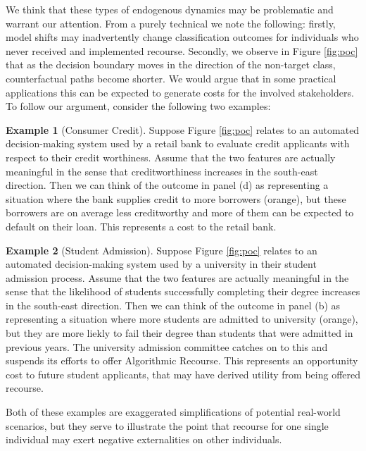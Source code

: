 \documentclass[conference,final,]{IEEEtran}
\theoremstyle{definition}
\theoremstyle{definition}
\newtheorem{example}{Example}[section]
\theoremstyle{definition}
\theoremstyle{definition}
\theoremstyle{remark}
\begin{document}
We think that these types of endogenous dynamics may be problematic and warrant our attention. From a purely technical we note the following: firstly, model shifts may inadvertently change classification outcomes for individuals who never received and implemented recourse. Secondly, we observe in Figure \ref{fig:poc} that as the decision boundary moves in the direction of the non-target class, counterfactual paths become shorter. We would argue that in some practical applications this can be expected to generate costs for the involved stakeholders. To follow our argument, consider the following two examples:

\begin{example}[Consumer Credit]
\protect\hypertarget{exm:consumer}{}\label{exm:consumer}Suppose Figure \ref{fig:poc} relates to an automated decision-making system used by a retail bank to evaluate credit applicants with respect to their credit worthiness. Assume that the two features are actually meaningful in the sense that creditworthiness increases in the south-east direction. Then we can think of the outcome in panel (d) as representing a situation where the bank supplies credit to more borrowers (orange), but these borrowers are on average less creditworthy and more of them can be expected to default on their loan. This represents a cost to the retail bank.
\end{example}

\begin{example}[Student Admission]
\protect\hypertarget{exm:student}{}\label{exm:student}Suppose Figure \ref{fig:poc} relates to an automated decision-making system used by a university in their student admission process. Assume that the two features are actually meaningful in the sense that the likelihood of students successfully completing their degree increases in the south-east direction. Then we can think of the outcome in panel (b) as representing a situation where more students are admitted to university (orange), but they are more liekly to fail their degree than students that were admitted in previous years. The university admission committee catches on to this and suspends its efforts to offer Algorithmic Recourse. This represents an opportunity cost to future student applicants, that may have derived utility from being offered recourse.
\end{example}

Both of these examples are exaggerated simplifications of potential real-world scenarios, but they serve to illustrate the point that recourse for one single individual may exert negative externalities on other individuals.
\end{document}
